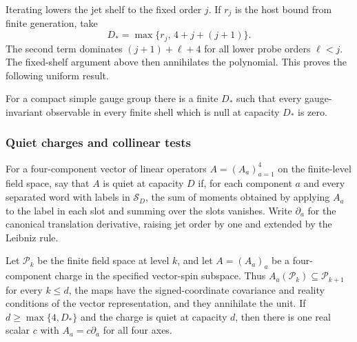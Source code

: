 Iterating lowers the jet shelf to the fixed order $j$.  If $r_j$ is the
host bound from finite generation, take
\[
 D_* = \max\{r_j,\,4+j+(j+1)\}.
\]
The second term dominates $(j+1)+\ell+4$ for all lower probe orders
$\ell<j$.  The fixed-shelf argument above then annihilates the polynomial.  This proves the following uniform result.

\begin{theorem}
\label{thm:free-uniform-detection}
For a compact simple gauge group there is a finite $D_*$ such that every
gauge-invariant observable in every finite shell which is null at capacity
$D_*$ is zero.
\end{theorem}

\subsubsection{Quiet charges and collinear tests}

For a four-component vector of linear operators $A=(A_a)_{a=1}^4$ on the
finite-level field space, say that $A$ is quiet at capacity $D$ if, for
each component $a$ and every separated word with labels in $\mathcal S_D$,
the sum of moments obtained by applying $A_a$ to the label in each slot
and summing over the slots vanishes.  Write
$\partial_a$ for the canonical translation derivative, raising jet order
by one and extended by the Leibniz rule.

\begin{theorem}
\label{thm:free-quiet-classification}
Let $\mathcal P_k$ be the finite field space at level $k$, and let
$A=(A_a)_a$ be a four-component charge in the specified vector-spin
subspace.  Thus $A_a(\mathcal P_k)\subseteq\mathcal P_{k+1}$ for every
$k\leq d$, the maps have the signed-coordinate covariance and reality
conditions of the vector representation, and they annihilate the unit.  If $d\geq\max\{4,D_*\}$ and the charge is quiet at
capacity $d$, then there is one real scalar $c$ with
$A_a=c\partial_a$ for all four axes.
\end{theorem}

